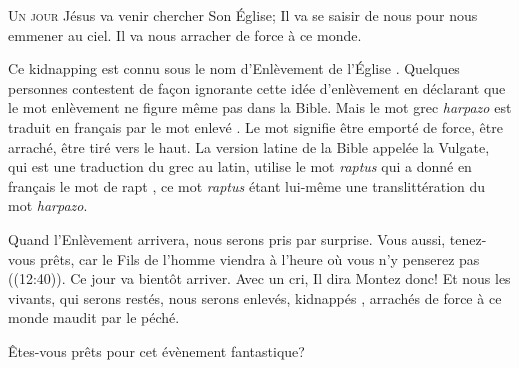 



\lettrine{U}{n jour} Jésus va venir chercher Son Église;
 Il va se saisir de nous pour nous emmener au ciel.
 Il va nous arracher de force à ce monde.

Ce \Og kidnapping \Fg{} est connu sous le nom \Og d'Enlèvement de l'Église \Fg{}.
 Quelques personnes contestent de fa\c{c}on ignorante cette idée d'enlèvement
 en déclarant que le mot \Og enlèvement \Fg{} ne figure même pas dans la Bible.
 Mais le mot grec \emph{harpazo} est traduit en fran\c{c}ais
 par le mot \Og enlevé \Fg{}. Le mot signifie \Og être emporté de force,
 être arraché, être tiré vers le haut. \Fg{}
 La version latine de la Bible appelée la Vulgate, qui est une traduction
 du grec au latin,  utilise
 le mot \emph{raptus} qui a donné en fran\c{c}ais le mot de \Og rapt \Fg{},
 ce mot \emph{raptus} étant lui-même une translittération du mot \emph{harpazo}. 


Quand l'Enlèvement arrivera, nous serons pris par surprise.
 \Og Vous aussi, tenez-vous prêts, car le Fils de l'homme viendra à l'heure
 où vous n'y penserez pas \Fg{}  ((12:40)).
 Ce jour va bientôt arriver. Avec un cri, Il dira\frcolon{} 
 \Og Montez donc! \Fg{} Et nous les vivants, qui serons restés,
 nous serons enlevés, \Og kidnappés \Fg{}, arrachés de force
 à ce monde maudit par le péché.

Êtes-vous prêts pour cet évènement fantastique?

\dvrule



